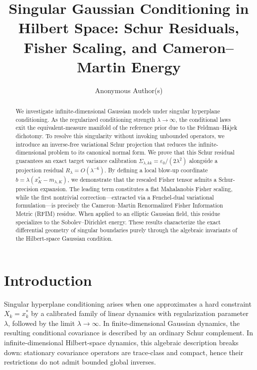 \documentclass[11pt]{amsart}
\title[Singular Gaussian Conditioning in Hilbert Space]{Singular Gaussian Conditioning in Hilbert Space: Schur Residuals, Fisher Scaling, and Cameron--Martin Energy}
\author{Anonymous Author(s)}
\theoremstyle{plain}
\theoremstyle{definition}
\theoremstyle{remark}
\begin{document}
\begin{abstract}
We investigate infinite-dimensional Gaussian models under singular hyperplane conditioning. As the regularized conditioning strength $\lambda \to \infty$, the conditional laws exit the equivalent-measure manifold of the reference prior due to the Feldman–H\'{a}jek dichotomy. To resolve this singularity without invoking unbounded operators, we introduce an inverse-free variational Schur projection that reduces the infinite-dimensional problem to its canonical normal form. We prove that this Schur residual guarantees an exact target variance calibration $\Sigma_{\lambda,kk} = \varepsilon_0/(2\lambda^2)$ alongside a projection residual $R_\lambda = O(\lambda^{-6})$. By defining a local blow-up coordinate $b = \lambda(x_K^* - m_{\lambda,K})$, we demonstrate that the rescaled Fisher tensor admits a Schur-precision expansion. The leading term constitutes a flat Mahalanobis Fisher scaling, while the first nontrivial correction—extracted via a Fenchel-dual variational formulation—is precisely the Cameron–Martin Renormalized Fisher Information Metric (RFIM) residue. When applied to an elliptic Gaussian field, this residue specializes to the Sobolev–Dirichlet energy. These results characterize the exact differential geometry of singular boundaries purely through the algebraic invariants of the Hilbert-space Gaussian condition.
\end{abstract}


\maketitle

\section{Introduction}
\label{sec:intro}

Singular hyperplane conditioning arises when one approximates a hard constraint $X_k = x_k^*$ by a calibrated family of linear dynamics with regularization parameter $\lambda$, followed by the limit $\lambda \to \infty$. In finite-dimensional Gaussian dynamics, the resulting conditional covariance is described by an ordinary Schur complement. In infinite-dimensional Hilbert-space dynamics, this algebraic description breaks down: stationary covariance operators are trace-class and compact, hence their restrictions do not admit bounded global inverses.
\end{document}
